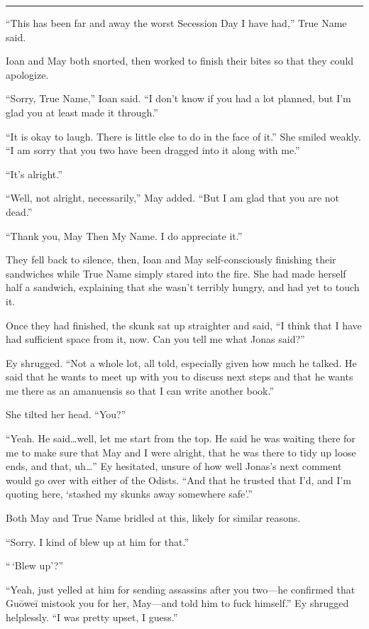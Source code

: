 \begin{center}\rule{0.5\linewidth}{0.5pt}\end{center}

``This has been far and away the worst Secession Day I have had,'' True Name said.

Ioan and May both snorted, then worked to finish their bites so that they could apologize.

``Sorry, True Name,'' Ioan said. ``I don't know if you had a lot planned, but I'm glad you at least made it through.''

``It is okay to laugh. There is little else to do in the face of it.'' She smiled weakly. ``I am sorry that you two have been dragged into it along with me.''

``It's alright.''

``Well, not alright, necessarily,'' May added. ``But I am glad that you are not dead.''

``Thank you, May Then My Name. I do appreciate it.''

They fell back to silence, then, Ioan and May self-consciously finishing their sandwiches while True Name simply stared into the fire. She had made herself half a sandwich, explaining that she wasn't terribly hungry, and had yet to touch it.

Once they had finished, the skunk sat up straighter and said, ``I think that I have had sufficient space from it, now. Can you tell me what Jonas said?''

Ey shrugged. ``Not a whole lot, all told, especially given how much he talked. He said that he wants to meet up with you to discuss next steps and that he wants me there as an amanuensis so that I can write another book.''

She tilted her head. ``You?''

``Yeah. He said\ldots well, let me start from the top. He said he was waiting there for me to make sure that May and I were alright, that he was there to tidy up loose ends, and that, uh\ldots{}'' Ey hesitated, unsure of how well Jonas's next comment would go over with either of the Odists. ``And that he trusted that I'd, and I'm quoting here, `stashed my skunks away somewhere safe'.''

Both May and True Name bridled at this, likely for similar reasons.

``Sorry. I kind of blew up at him for that.''

``\,`Blew up'?''

``Yeah, just yelled at him for sending assassins after you two—he confirmed that Guōweī mistook you for her, May—and told him to fuck himself.'' Ey shrugged helplessly. ``I was pretty upset, I guess.''

